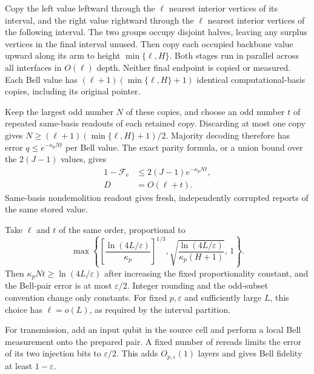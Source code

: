 \documentclass[aps,prl,twocolumn,superscriptaddress,longbibliography,reprint,floatfix]{revtex4-2}
\newcommand{\eps}{\varepsilon}
\newcommand{\Fe}{\mathcal F_{\mathrm e}}
\begin{document}
Copy the left value leftward through the $\ell$ nearest interior
vertices of its interval, and the right value rightward through the
$\ell$ nearest interior vertices of the following interval.
The two groups occupy disjoint halves, leaving any surplus vertices
in the final interval unused.
Then copy each occupied backbone value upward along its arm to
height $\min\{\ell,H\}$.
Both stages run in parallel across all interfaces in $O(\ell)$ depth.
Neither final endpoint is copied or measured.
Each Bell value has
$(\ell+1)(\min\{\ell,H\}+1)$ identical computational-basis copies,
including its original pointer.

Keep the largest odd number $N$ of these copies, and choose an odd
number $t$ of repeated same-basis readouts of each retained copy.
Discarding at most one copy gives
$N\ge(\ell+1)(\min\{\ell,H\}+1)/2$.
Majority decoding therefore has error
$q\le e^{-\kappa_pNt}$ per Bell value.
The exact parity formula, or a union bound over the $2(J-1)$ values,
gives
\begin{equation}
 \begin{split}
 1-\Fe&\le2(J-1)e^{-\kappa_pNt},\\
 D&=O(\ell+t).
 \end{split}
 \label{eq:comb-explicit-upper}
\end{equation}
Same-basis nondemolition readout gives fresh, independently corrupted
reports of the same stored value.

Take $\ell$ and $t$ of the same order, proportional to
\[
 \max\!\left\{
 \left[\frac{\ln(4L/\eps)}{\kappa_p}\right]^{1/3},
 \sqrt{\frac{\ln(4L/\eps)}
              {\kappa_p(H+1)}},\,1\right\}.
 \]
Then $\kappa_pNt\ge\ln(4L/\eps)$ after increasing the fixed
proportionality constant, and the Bell-pair error is at most $\eps/2$.
Integer rounding and the odd-subset convention change only constants.
For fixed $p,\eps$ and sufficiently large $L$, this choice has
$\ell=o(L)$, as required by the interval partition.

For transmission, add an input qubit in the source cell and perform a
local Bell measurement onto the prepared pair. A fixed number of rereads
limits the error of its two injection bits to $\eps/2$. This adds
$O_{p,\eps}(1)$ layers and gives Bell fidelity at least $1-\eps$.
\end{document}
